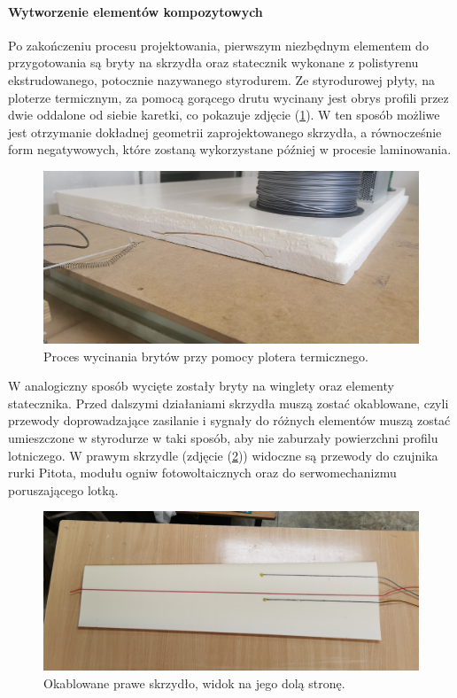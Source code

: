 \documentclass[12pt, a4paper]{article}
\let\oldref\ref
\renewcommand{\ref}[1]{(\oldref{#1})}
\begin{document}
\FloatBarrier
\paragraph{Wytworzenie elementów kompozytowych}\mbox{}

Po zakończeniu procesu projektowania, pierwszym niezbędnym elementem do przygotowania są bryty na skrzydła oraz statecznik wykonane z polistyrenu ekstrudowanego, potocznie nazywanego styrodurem. Ze styrodurowej płyty, na ploterze termicznym, za pomocą gorącego drutu wycinany jest obrys profili przez dwie oddalone od siebie karetki, co pokazuje zdjęcie \ref{fig:ploter}. W ten sposób możliwe jest otrzymanie dokładnej geometrii zaprojektowanego skrzydła, a równocześnie form negatywowych, które zostaną wykorzystane później w procesie laminowania.

\begin{figure}[ht]
    \centering
    \includegraphics[width=1\textwidth]{budowa5}
    \caption{Proces wycinania brytów przy pomocy plotera termicznego.}
    \label{fig:ploter}
\end{figure}
 
W analogiczny sposób wycięte zostały bryty na winglety oraz elementy statecznika. Przed dalszymi działaniami skrzydła muszą zostać okablowane, czyli przewody doprowadzające zasilanie i sygnały do różnych elementów muszą zostać umieszczone w styrodurze w taki sposób, aby nie zaburzały powierzchni profilu lotniczego. W prawym skrzydle (zdjęcie \ref{fig:okablowane}) widoczne są przewody do czujnika rurki Pitota, modułu ogniw fotowoltaicznych oraz do serwomechanizmu poruszającego lotką.

 \begin{figure}[ht]
    \centering
    \includegraphics[width=1\textwidth]{okablowany}
    \caption{Okablowane prawe skrzydło, widok na jego dolą stronę.}
    \label{fig:okablowane}
\end{figure}
\end{document}
